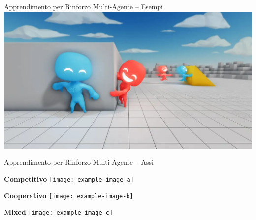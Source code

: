 \documentclass[presentation, 10pt,aspectratio=169]{beamer}\mode<presentation>{\usetheme{AMSBolognaFC}}
\begin{document}
\begin{frame}{Apprendimento per Rinforzo Multi-Agente -- Esempi}
	\includegraphics[width=\textwidth]{img/hide-and-seek.png}
\end{frame}
\begin{frame}{Apprendimento per Rinforzo Multi-Agente -- Assi}
	\begin{minipage}{0.32\textwidth}
		\centering
		\textbf{Competitivo}
		\texttt{[image: example-image-a]}
	\end{minipage}
	\hfill
	\begin{minipage}{0.32\textwidth}
		\centering
		\textbf{\alert{Cooperativo}}
		\texttt{[image: example-image-b]}
	\end{minipage}
	\hfill
	\begin{minipage}{0.32\textwidth}
		\centering
		\textbf{Mixed}
		\texttt{[image: example-image-c]}
	\end{minipage}
\end{frame}
\end{document}
